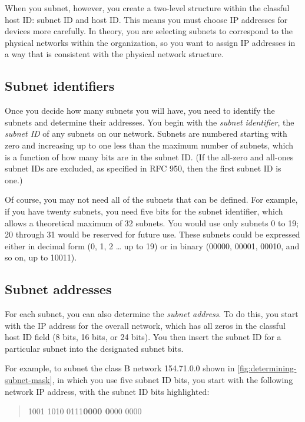 When you subnet, however, you create a two-level structure within the
classful host ID: subnet ID and host ID. This means you must choose IP
addresses for devices more carefully. In theory, you are selecting
subnets to correspond to the physical networks within the organization,
so you want to assign IP addresses in a way that is consistent with the
physical network structure.



\subsection{Subnet identifiers}

Once you decide how many subnets you will have, you need to identify the
subnets and determine their addresses. You begin with the {\emph{subnet
identifier}}, the {\emph{subnet ID}} of any subnets on our network.
Subnets are numbered starting with zero and increasing up to one less
than the maximum number of subnets, which is a function of how many bits
are in the subnet ID. (If the all-zero and all-ones subnet IDs are
excluded, as specified in RFC 950, then the first subnet ID is one.)

Of course, you may not need all of the subnets that can be defined. For
example, if you have twenty subnets, you need five bits for the subnet
identifier, which allows a theoretical maximum of 32 subnets. You would
use only subnets 0 to 19; 20 through 31 would be reserved for future
use. These subnets could be expressed either in decimal form (0, 1, 2
\ldots{} up to 19) or in binary (00000, 00001, 00010, and so on, up to
10011).

\subsection{Subnet addresses}

For each subnet, you can also determine the {\emph{subnet address}}. To
do this, you start with the IP address for the overall network, which
has all zeros in the classful host ID field (8 bits, 16 bits, or 24
bits). You then insert the subnet ID for a particular subnet into the
designated subnet bits.

For example, to subnet the class B network 154.71.0.0 shown in \vref{fig:determining-subnet-mask},
in which you use five subnet ID bits, you start with the following network IP address, with the subnet ID bits highlighted:

\begin{quote}
   1001 1010 0111\quad \textbf{0000 0}000 0000
\end{quote}

